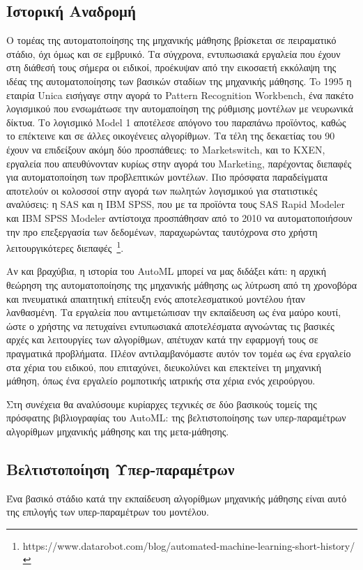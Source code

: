  \subsection{Ιστορική Αναδρομή} \label{section:autohistory}
 Ο τομέας της αυτοματοποίησης της μηχανικής μάθησης βρίσκεται σε πειραματικό στάδιο, όχι όμως και σε εμβρυικό. Τα σύγχρονα, εντυπωσιακά εργαλεία που έχουν στη διάθεσή τους σήμερα οι ειδικοί, προέκυψαν από την εικοσαετή εκκόλαψη της ιδέας της αυτοματοποίησης των βασικών σταδίων της μηχανικής μάθησης. To 1995 η εταιρία Unica εισήγαγε στην αγορά το Pattern Recognition Workbench, ένα πακέτο λογισμικού
 που ενσωμάτωσε την αυτομαποίηση της ρύθμισης μοντέλων με νευρωνικά δίκτυα. Το λογισμικό Model 1 αποτέλεσε απόγονο του παραπάνω προϊόντος, καθώς το επέκτεινε και σε άλλες οικογένειες αλγορίθμων. Τα τέλη της δεκαετίας του 90 έχουν να επιδείξουν ακόμη δύο προσπάθειες: το Marketswitch, και το KXEN, εργαλεία που απευθύνονταν κυρίως στην αγορά του Marketing, παρέχοντας διεπαφές για αυτοματοποίηση των προβλεπτικών μοντέλων. Πιο πρόσφατα παραδείγματα αποτελούν οι κολοσσοί στην αγορά των πωλητών λογισμικού για στατιστικές αναλύσεις: η SAS και η IBM SPSS, που με τα προϊόντα τους SAS Rapid Modeler και IBM SPSS Modeler αντίστοιχα προσπάθησαν από το 2010 να αυτοματοποιήσουν την προ επεξεργασία των δεδομένων, παραχωρώντας ταυτόχρονα στο χρήστη λειτουργικότερες διεπαφές~\footnote{https://www.datarobot.com/blog/automated-machine-learning-short-history/}.
 
 Αν και βραχύβια, η ιστορία του AutoML μπορεί να μας διδάξει κάτι: η αρχική θεώρηση της αυτοματοποίησης της μηχανικής μάθησης ως λύτρωση  από τη χρονοβόρα και πνευματικά απαιτητική επίτευξη ενός αποτελεσματικού μοντέλου ήταν λανθασμένη. Τα εργαλεία που αντιμετώπισαν την εκπαίδευση ως ένα μαύρο κουτί, ώστε ο χρήστης να πετυχαίνει εντυπωσιακά αποτελέσματα αγνοώντας τις βασικές αρχές και λειτουργίες των αλγορίθμων, απέτυχαν κατά την εφαρμογή τους σε πραγματικά προβλήματα. Πλέον αντιλαμβανόμαστε αυτόν τον τομέα ως ένα εργαλείο στα χέρια του ειδικού, που επιταχύνει, διευκολύνει και επεκτείνει τη μηχανική μάθηση, όπως ένα  εργαλείο ρομποτικής ιατρικής στα χέρια ενός χειρούργου. 
 
 Στη συνέχεια θα αναλύσουμε κυρίαρχες τεχνικές σε δύο βασικούς τομείς της πρόσφατης βιβλιογραφίας του AutoML: της βελτιστοποίησης των υπερ-παραμέτρων αλγορίθμων μηχανικής μάθησης και της μετα-μάθησης.
 
 \subsection{Βελτιστοποίηση Υπερ-παραμέτρων} \label{section:opt}
 	Ένα βασικό στάδιο κατά την εκπαίδευση αλγορίθμων μηχανικής μάθησης είναι αυτό της επιλογής των υπερ-παραμέτρων του μοντέλου.
 	
